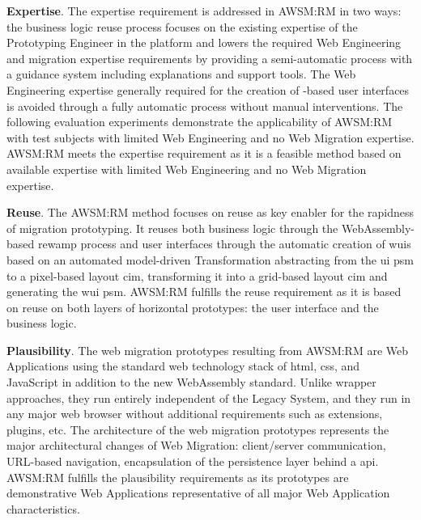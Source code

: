 \vspace{-10pt}
\textbf{Expertise}.
The expertise requirement is addressed in AWSM:RM in two ways: the business logic reuse process focuses on the existing expertise of the Prototyping Engineer in the  platform and lowers the required \gls{Web Engineering} and migration expertise requirements by providing a semi-automatic process with a guidance system including explanations and support tools.
The \gls{Web Engineering} expertise generally required for the creation of -based user interfaces is avoided through a fully automatic process without manual interventions.
The following evaluation experiments demonstrate the applicability of AWSM:RM with test subjects with limited \gls{Web Engineering} and no \gls{Web Migration} expertise.
AWSM:RM meets the expertise requirement as it is a feasible method based on available expertise with limited \gls{Web Engineering} and no \gls{Web Migration} expertise.

\vspace{-10pt}
\textbf{Reuse}.
The AWSM:RM method focuses on reuse as key enabler for the rapidness of \web migration prototyping.
It reuses both  business logic through the WebAssembly-based \gls{rewamp} process and  user interfaces through the automatic creation of \glspl{wui} based on an automated model-driven \gls{Transformation} abstracting from the  \gls{ui} \gls{psm} to a pixel-based layout \gls{cim}, transforming it into a grid-based layout \gls{cim} and generating the \gls{wui} \gls{psm}.
AWSM:RM fulfills the reuse requirement as it is based on reuse on both layers of horizontal prototypes: the user interface and the business logic.

\vspace{-10pt}
\textbf{Plausibility}.
The \glspl{web migration prototype} resulting from AWSM:RM are \glspl{Web Application} using the standard \gls{web} technology stack of \gls{html}, \gls{css}, and JavaScript in addition to the new WebAssembly standard.
Unlike wrapper approaches, they run entirely independent of the \gls{Legacy System}, and they run in any major \gls{web} browser without additional requirements such as extensions, plugins, etc.
The architecture of the \glspl{web migration prototype} represents the major architectural changes of \gls{Web Migration}: client/server communication, URL-based navigation, encapsulation of the persistence layer behind a  \gls{api}.
AWSM:RM fulfills the plausibility requirements as its prototypes are demonstrative \glspl{Web Application} representative of all major \gls{Web Application} characteristics.

